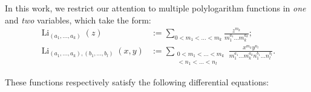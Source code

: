 \documentclass[a4paper,fleqn]{cas-sc}
\DeclareMathOperator{\Li}{Li}
\begin{document}
In this work, we restrict our attention to multiple polylogarithm functions in \textit{one} and \textit{two} variables,
which take the form:
\begin{equation}
\label{eq:polylogs-1-2}
\begin{split}
	\Li_{(a_1, \ldots, a_k)}(z) & :=\sum_{0<m_1<\dots<m_k}\frac{z^{m_k}}{m^{a_1}_1\dots m^{a_k}_k}; \\
    \Li_{(a_1, \ldots, a_k),(b_1, \ldots, b_l)}(x,y) & :=\sum_{\substack{0<m_1<\dots< m_k\\ <n_1<\dots <n_l}}\frac{x^{m_k}y^{n_l}}{m^{a_1}_1\dots m^{a_k}_kn^{b_1}_1\dots n^{b_l}_l}.
\end{split}
\end{equation}

These functions respectively satisfy the following differential equations:
\end{document}
